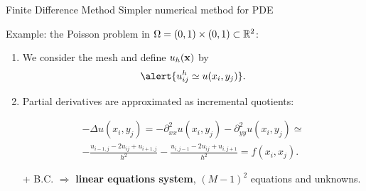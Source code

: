\begin{frame}{Finite Difference Method}
Simpler numerical method for PDE

Example: the \alert{Poisson problem} in
$\Omega=(0,1)\times (0,1) \subset{\mathbb R}^2$:

\begin{enumerate}
  \setlength\itemsep{1.1em}
\item We consider the mesh 
and \alert{define $u_h(\mathbf{x})$ by} 
$$
\alert{u^h_{ij}\simeq u(x_i,y_j)}.
$$
\item Partial derivatives are approximated  as incremental quotients:
  \begin{BlockNoTitle}
    \vspace{-1.5em}
    \begin{multline*}
      -\Delta u(x_i,y_j) = -\partial^2_{xx}u(x_i,y_j)
      -\partial^2_{yy}u(x_i,y_j)\simeq
      \\
      -\frac{u_{i-1,j}-2u_{ij}+u_{i+1,j}}{h^2}
      -\frac{u_{i,j-1}-2u_{ij}+u_{i,j+1}}{h^2} = f(x_i,x_j).
    \end{multline*}
  \end{BlockNoTitle}
  + B.C. $\Rightarrow$ \textbf{linear equations system}, $(M-1)^2$ equations and unknowns.
\end{enumerate}

\end{frame}

